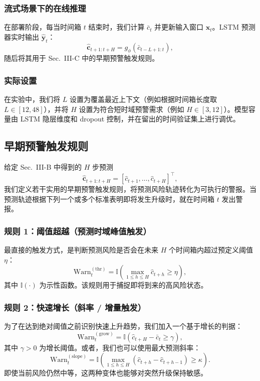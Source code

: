 \documentclass[conference]{IEEEtran}
\begin{document}
\subsubsection{流式场景下的在线推理}

在部署阶段，每当时间箱 $t$ 结束时，我们计算 $\bar{c}_t$ 并更新输入窗口 $\mathbf{x}_t$。LSTM 预测器实时输出 $\hat{\mathbf{y}}_t$：
\begin{equation}
\hat{\mathbf{c}}_{t+1:t+H} = g_\phi(\bar{c}_{t-L+1:t}),
\end{equation}
随后将其用于 Sec.~III-C 中的早期预警触发规则。

\subsubsection{实际设置}

在实验中，我们将 $L$ 设置为覆盖最近上下文（例如根据时间箱长度取 $L\in[12,48]$），并将 $H$ 设置为符合短时域预警需求（例如 $H\in[3,12]$）。模型容量由 LSTM 隐层维度和 dropout 控制，并在留出的时间验证集上进行调优。

\subsection{早期预警触发规则}\label{sec:warning_rules}

给定 Sec.~III-B 中得到的 $H$ 步预测
\[
\hat{\mathbf{c}}_{t+1:t+H}=[\hat c_{t+1},\dots,\hat c_{t+H}]^\top,
\]
我们定义若干实用的早期预警触发规则，将预测风险轨迹转化为可执行的警报。当预测轨迹根据下列一个或多个标准表明即将发生升级时，就在时间箱 $t$ 发出警报。

\subsubsection{规则 1：阈值超越（预测时域峰值触发）}

最直接的触发方式，是判断预测风险是否会在未来 $H$ 个时间箱内超过预定义阈值 $\eta$：
\begin{equation}
\mathrm{Warn}_t^{(\mathrm{thr})}=
\mathbb{I}\left(\max_{1\le h\le H}\hat c_{t+h}\ge \eta\right),
\label{eq:warn_threshold}
\end{equation}
其中 $\mathbb{I}(\cdot)$ 为示性函数。该规则用于捕捉即将到来的高风险状态。

\subsubsection{规则 2：快速增长（斜率 / 增量触发）}

为了在达到绝对阈值之前识别快速上升趋势，我们加入一个基于增长的判据：
\begin{equation}
\mathrm{Warn}_t^{(\mathrm{grow})}=
\mathbb{I}\left(\hat c_{t+H}-\bar c_t \ge \gamma\right),
\label{eq:warn_growth}
\end{equation}
其中 $\gamma>0$ 为增长阈值。或者，我们也可以使用最大预测斜率：
\begin{equation}
\mathrm{Warn}_t^{(\mathrm{slope})}=
\mathbb{I}\left(\max_{1\le h\le H}(\hat c_{t+h}-\hat c_{t+h-1})\ge \kappa\right).
\label{eq:warn_slope}
\end{equation}
即使当前风险仍然中等，这两种变体也能够对突然升级保持敏感。
\end{document}
